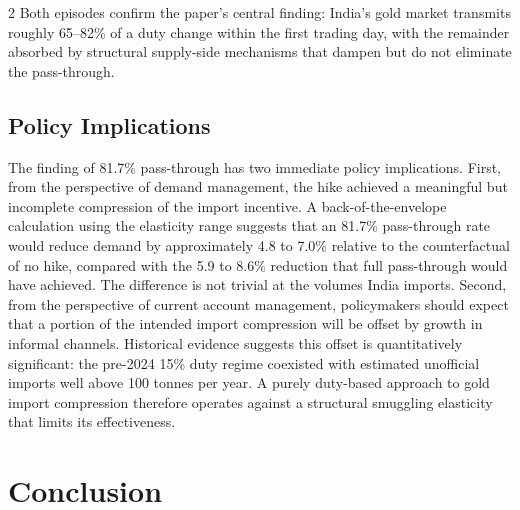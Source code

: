 \documentclass[12pt]{article}
\begin{document}
\begin{multicols}{2}
Both episodes confirm the paper's central finding: India's gold market transmits roughly 65--82\% of a duty change within the first trading day, with the remainder absorbed by structural supply-side mechanisms that dampen but do not eliminate the pass-through.

\subsection*{Policy Implications}

The finding of 81.7\% pass-through has two immediate policy implications. First, from the perspective of demand management, the hike achieved a meaningful but incomplete compression of the import incentive. A back-of-the-envelope calculation using the \citet{KanjilalGhosh2014} elasticity range suggests that an 81.7\% pass-through rate would reduce demand by approximately 4.8 to 7.0\% relative to the counterfactual of no hike, compared with the 5.9 to 8.6\% reduction that full pass-through would have achieved. The difference is not trivial at the volumes India imports. Second, from the perspective of current account management, policymakers should expect that a portion of the intended import compression will be offset by growth in informal channels. Historical evidence suggests this offset is quantitatively significant: the pre-2024 15\% duty regime coexisted with estimated unofficial imports well above 100 tonnes per year. A purely duty-based approach to gold import compression therefore operates against a structural smuggling elasticity that limits its effectiveness.

\section{Conclusion}
\label{sec:conclusion}


\end{multicols}
\end{document}
